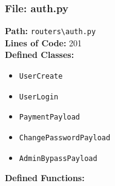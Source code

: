 \documentclass[10pt,journal,compsoc]{IEEEtran}
\begin{document}
\subsubsection{File: auth.py}
\textbf{Path:} \texttt{routers\textbackslash{}auth.py} \\
\textbf{Lines of Code:} 201 \\
\textbf{Defined Classes:}
\begin{itemize}
    \item \texttt{UserCreate}
    \item \texttt{UserLogin}
    \item \texttt{PaymentPayload}
    \item \texttt{ChangePasswordPayload}
    \item \texttt{AdminBypassPayload}
\end{itemize}
\textbf{Defined Functions:}
\end{document}
